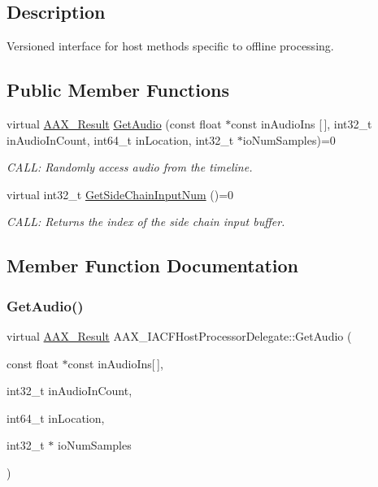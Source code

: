 \subsection{Description}
Versioned interface for host methods specific to offline processing. \subsection*{Public Member Functions}
\begin{DoxyCompactItemize}
\item 
virtual \mbox{\hyperlink{a00392_a4d8f69a697df7f70c3a8e9b8ee130d2f}{A\+A\+X\+\_\+\+Result}} \mbox{\hyperlink{a01701_aec640f726cda43de41d2bc6d7c00f3fd}{Get\+Audio}} (const float $\ast$const in\+Audio\+Ins \mbox{[}$\,$\mbox{]}, int32\+\_\+t in\+Audio\+In\+Count, int64\+\_\+t in\+Location, int32\+\_\+t $\ast$io\+Num\+Samples)=0
\begin{DoxyCompactList}\small\item\em C\+A\+LL\+: Randomly access audio from the timeline. \end{DoxyCompactList}\item 
virtual int32\+\_\+t \mbox{\hyperlink{a01701_afb19dc4aa2e5d81d61700be11cfcea20}{Get\+Side\+Chain\+Input\+Num}} ()=0
\begin{DoxyCompactList}\small\item\em C\+A\+LL\+: Returns the index of the side chain input buffer. \end{DoxyCompactList}\end{DoxyCompactItemize}


\subsection{Member Function Documentation}
\mbox{\label{a01701_aec640f726cda43de41d2bc6d7c00f3fd}} 
\subsubsection{\texorpdfstring{GetAudio()}{GetAudio()}}
{\footnotesize\ttfamily virtual \mbox{\hyperlink{a00392_a4d8f69a697df7f70c3a8e9b8ee130d2f}{A\+A\+X\+\_\+\+Result}} A\+A\+X\+\_\+\+I\+A\+C\+F\+Host\+Processor\+Delegate\+::\+Get\+Audio (\begin{DoxyParamCaption}\item[{const float $\ast$const}]{in\+Audio\+Ins\mbox{[}$\,$\mbox{]},  }\item[{int32\+\_\+t}]{in\+Audio\+In\+Count,  }\item[{int64\+\_\+t}]{in\+Location,  }\item[{int32\+\_\+t $\ast$}]{io\+Num\+Samples }\end{DoxyParamCaption})\hspace{0.3cm}{\ttfamily [pure virtual]}}



